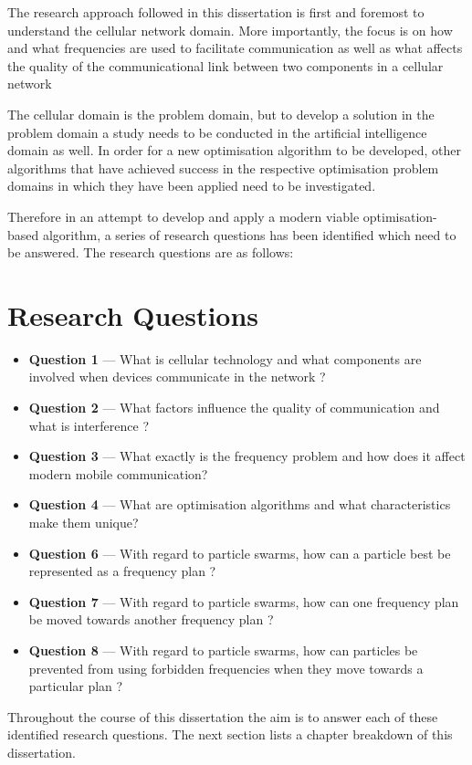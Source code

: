 The research approach followed in this dissertation is first and foremost to understand the cellular network domain. More importantly, the focus is on how and what frequencies are used to facilitate communication as well as what affects the quality of the communicational link between two components in a cellular network 

The cellular domain is the problem domain, but to develop a solution in the problem domain a study needs to be conducted in the artificial intelligence domain as well. In order for a new optimisation algorithm to be developed, other algorithms that have achieved success in the respective optimisation problem domains in which they have been applied need to be investigated.

Therefore in an attempt to develop and apply a modern viable optimisation-based algorithm, a series of research questions has been identified which need to be answered. The research questions are as follows:
\section{Research Questions}
\begin{itemize}
\item \textbf{Question 1} --- What is cellular technology and what components are involved when devices communicate in the network ?
\item \textbf{Question 2} --- What factors influence the quality of communication and what is interference ?
\item \textbf{Question 3} --- What exactly is the frequency problem and how does it affect modern mobile communication?
\item \textbf{Question 4} --- What are optimisation algorithms and what characteristics make them unique?
\item \textbf{Question 6} --- With regard to particle swarms, how can a particle best be represented as a frequency plan ?
\item \textbf{Question 7} --- With regard to particle swarms, how can one frequency plan be moved towards another frequency plan ?
\item \textbf{Question 8} --- With regard to particle swarms, how can particles be prevented from using forbidden frequencies when they move towards a particular plan ?
\end{itemize}

Throughout the course of this dissertation the aim is to answer each of these identified research questions. The next section lists a chapter breakdown of this dissertation.


